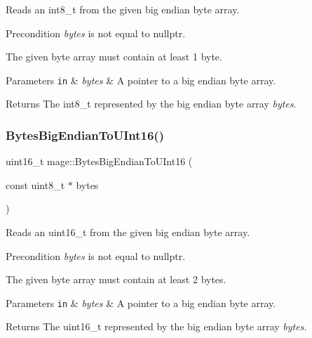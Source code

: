 Reads an int8\+\_\+t from the given big endian byte array.

\begin{DoxyPrecond}{Precondition}
{\itshape bytes} is not equal to {\ttfamily nullptr}. 

The given byte array must contain at least 1 byte. 
\end{DoxyPrecond}

\begin{DoxyParams}[1]{Parameters}
\mbox{\tt in}  & {\em bytes} & A pointer to a big endian byte array. \\
\hline
\end{DoxyParams}
\begin{DoxyReturn}{Returns}
The {\ttfamily int8\+\_\+t} represented by the big endian byte array {\itshape bytes}. 
\end{DoxyReturn}
\hypertarget{namespacemage_a90b2972b7a2a01d4a911d071303bc400}{}\label{namespacemage_a90b2972b7a2a01d4a911d071303bc400} 
\subsubsection{\texorpdfstring{Bytes\+Big\+Endian\+To\+U\+Int16()}{BytesBigEndianToUInt16()}}
{\footnotesize\ttfamily uint16\+\_\+t mage\+::\+Bytes\+Big\+Endian\+To\+U\+Int16 (\begin{DoxyParamCaption}\item[{const uint8\+\_\+t $\ast$}]{bytes }\end{DoxyParamCaption})}

Reads an uint16\+\_\+t from the given big endian byte array.

\begin{DoxyPrecond}{Precondition}
{\itshape bytes} is not equal to {\ttfamily nullptr}. 

The given byte array must contain at least 2 bytes. 
\end{DoxyPrecond}

\begin{DoxyParams}[1]{Parameters}
\mbox{\tt in}  & {\em bytes} & A pointer to a big endian byte array. \\
\hline
\end{DoxyParams}
\begin{DoxyReturn}{Returns}
The {\ttfamily uint16\+\_\+t} represented by the big endian byte array {\itshape bytes}. 
\end{DoxyReturn}
\hypertarget{namespacemage_aab7d431dcaf0965028de7c5dee9c3da4}{}\label{namespacemage_aab7d431dcaf0965028de7c5dee9c3da4} 
